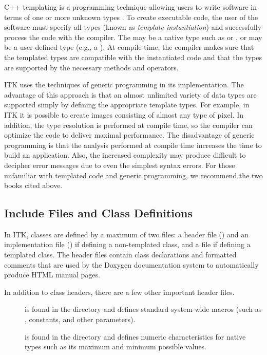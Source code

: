 C++ templating is a programming technique allowing users to write software in
terms of one or more unknown types . To create executable code, the
user of the software must specify all types  (known as \emph{template
instantiation}) and successfully process the code with the compiler. The
 may be a native type such as
 or , or  may be a user-defined type (e.g.,
a ). At compile-time, the compiler makes sure that the templated
types are compatible with the instantiated code and that the types are
supported by the necessary methods and operators.

ITK uses the techniques of generic programming in its implementation. The
advantage of this approach is that an almost unlimited variety of data types
are supported simply by defining the appropriate template types. For example,
in ITK it is possible to create images consisting of almost any type of
pixel. In addition, the type resolution is performed at compile time, so the
compiler can optimize the code to deliver maximal performance. The
disadvantage of generic programming is that the analysis performed at compile
time increases the time to build an application. Also, the increased
complexity may produce difficult to decipher error messages due to even the
simplest syntax errors. For those unfamiliar with templated code and
generic programming, we recommend the two books cited above.

\subsection{Include Files and Class Definitions}
\label{sec:IncludeFiles}

In ITK, classes are defined by a maximum of two files: a header file ()
and an implementation file () if defining a non-templated class, and a
 file if defining a templated class.
The header files contain class declarations
and formatted comments that are used by the Doxygen documentation
system to automatically produce HTML manual pages.

In addition to class headers, there are a few other important header files.
\begin{description}
    \item[] is found in the
     directory
    and defines standard system-wide macros (such as ,
    constants, and other parameters).

    \item[] is found in the
     directory and defines numeric
    characteristics for native types such as its maximum and minimum
    possible values.
\end{description}

